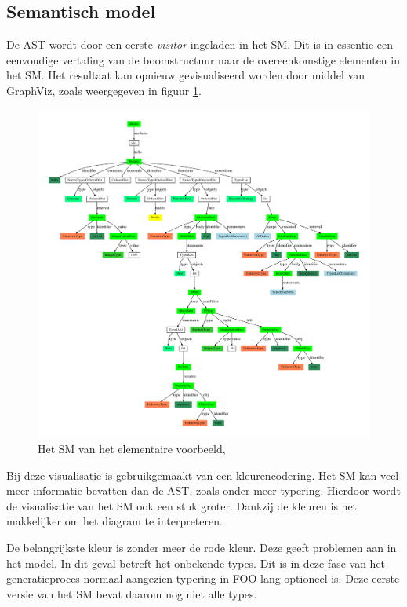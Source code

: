 
\subsection{Semantisch model}
\label{subsection:devel-semantic-model}

De AST wordt door een eerste \emph{visitor} ingeladen in het SM. Dit is in
essentie een eenvoudige vertaling van de boomstructuur naar de overeenkomstige
elementen in het SM. Het resultaat kan opnieuw gevisualiseerd worden door
middel van GraphViz, zoals weergegeven in figuur \ref{fig:hello.sm}.

\begin{figure}[ht]
  \centering
  \includegraphics[width=\linewidth]{resources/hello_sm.pdf}
  \caption{Het SM van het elementaire voorbeeld, }
  \label{fig:hello.sm}
\end{figure}

Bij deze visualisatie is gebruikgemaakt van een kleurencodering. Het SM kan
veel meer informatie bevatten dan de AST, zoals onder meer typering. Hierdoor
wordt de visualisatie van het SM ook een stuk groter. Dankzij de kleuren is het
makkelijker om het diagram te interpreteren.

De belangrijkste kleur is zonder meer de rode kleur. Deze geeft problemen aan
in het model. In dit geval betreft het onbekende types. Dit is in deze fase van
het generatieproces normaal aangezien typering in FOO-lang optioneel is. Deze
eerste versie van het SM bevat daarom nog niet alle types.

